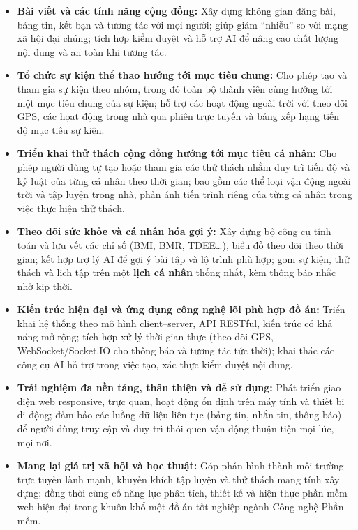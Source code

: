 \begin{itemize}
    \item \textbf{Bài viết và các tính năng cộng đồng:} Xây dựng không gian đăng bài, bảng tin, kết bạn và tương tác với mọi người; giúp giảm ``nhiễu'' so với mạng xã hội đại chúng; tích hợp kiểm duyệt và hỗ trợ AI để nâng cao chất lượng nội dung và an toàn khi tương tác.

    \item \textbf{Tổ chức sự kiện thể thao hướng tới mục tiêu chung:} Cho phép tạo và tham gia sự kiện theo nhóm, trong đó toàn bộ thành viên cùng hướng tới một mục tiêu chung của sự kiện; hỗ trợ các hoạt động ngoài trời với theo dõi GPS, các họat động trong nhà qua phiên trực tuyến và bảng xếp hạng tiến độ mục tiêu sự kiện.

    \item \textbf{Triển khai thử thách cộng đồng hướng tới mục tiêu cá nhân:} Cho phép người dùng tự tạo hoặc tham gia các thử thách nhằm duy trì tiến độ và kỷ luật của từng cá nhân theo thời gian; bao gồm các thể loại vận động ngoài trời và tập luyện trong nhà, phản ánh tiến trình riêng của từng cá nhân trong việc thực hiện thử thách.

    \item \textbf{Theo dõi sức khỏe và cá nhân hóa gợi ý:} Xây dựng bộ công cụ tính toán và lưu vết các chỉ số (BMI, BMR, TDEE\ldots), biểu đồ theo dõi theo thời gian; kết hợp trợ lý AI để gợi ý bài tập và lộ trình phù hợp; gom sự kiện, thử thách và lịch tập trên một \textbf{lịch cá nhân} thống nhất, kèm thông báo nhắc nhở kịp thời.

    \item \textbf{Kiến trúc hiện đại và ứng dụng công nghệ lõi phù hợp đồ án:} Triển khai hệ thống theo mô hình client--server, API RESTful, kiến trúc có khả năng mở rộng; tích hợp xử lý thời gian thực (theo dõi GPS, WebSocket/Socket.IO cho thông báo và tương tác tức thời); khai thác các công cụ AI hỗ trợ trong việc tạo, xác thực kiểm duyệt nội dung.

    \item \textbf{Trải nghiệm đa nền tảng, thân thiện và dễ sử dụng:} Phát triển giao diện web responsive, trực quan, hoạt động ổn định trên máy tính và thiết bị di động; đảm bảo các luồng dữ liệu liên tục (bảng tin, nhắn tin, thông báo) để người dùng truy cập và duy trì thói quen vận động thuận tiện mọi lúc, mọi nơi.

    \item \textbf{Mang lại giá trị xã hội và học thuật:} Góp phần hình thành môi trường trực tuyến lành mạnh, khuyến khích tập luyện và thử thách mang tính xây dựng; đồng thời củng cố năng lực phân tích, thiết kế và hiện thực phần mềm web hiện đại trong khuôn khổ một đồ án tốt nghiệp ngành Công nghệ Phần mềm.
\end{itemize}

